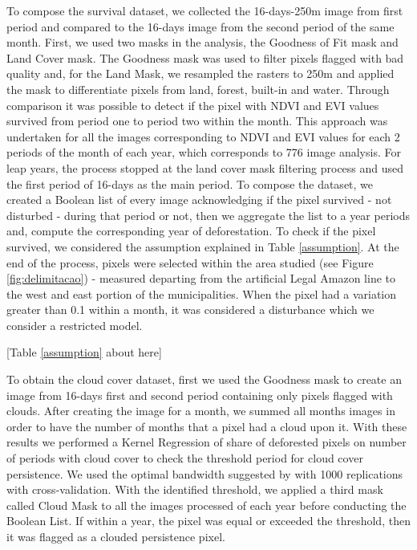To compose the survival dataset, we collected the 16-days-250m image from first period and compared to the 16-days image from the second period of the same month. First, we used two masks in the analysis, the Goodness of Fit mask and Land Cover mask. The Goodness mask was used to filter pixels flagged with bad quality and, for the Land Mask, we resampled the rasters to 250m and applied the mask to differentiate pixels from land, forest, built-in and water. Through comparison it was possible to detect if the pixel with NDVI and EVI values survived from period one to period two within the month. This approach was undertaken for all the images corresponding to NDVI and EVI values for each 2 periods of the month of each year, which corresponds to 776 image analysis. For leap years, the process stopped at the land cover mask filtering process and used the first period of 16-days as the main period. To compose the dataset, we created a Boolean list of every image acknowledging if the pixel survived - not disturbed - during that period or not, then we aggregate the list to a year periods and, compute the corresponding year of deforestation. To check if the pixel survived, we considered the assumption explained in Table \ref{assumption}. At the end of the process, pixels were selected within the area studied (see Figure \ref{fig:delimitacao}) - measured departing from the artificial Legal Amazon line to the west and east portion of the municipalities. When the pixel had a variation greater than 0.1 within a month, it was considered a disturbance which we consider a restricted model.

[Table \ref{assumption} about here]

To obtain the cloud cover dataset, first we used the Goodness mask to create an image from 16-days first and second period containing only pixels flagged with clouds. After creating the image for a month, we summed all months images in order to have the number of months that a pixel had a cloud upon it. With these results we performed a Kernel Regression of share of deforested pixels on number of periods with cloud cover to check the threshold period for cloud cover persistence. We used the optimal bandwidth suggested by \citet{bowman_azzalini_1997} with 1000 replications with cross-validation. With the identified threshold, we applied a third mask called Cloud Mask to all the images processed of each year before conducting the Boolean List. If within a year, the pixel was equal or exceeded the threshold, then it was flagged as a clouded persistence pixel. 


